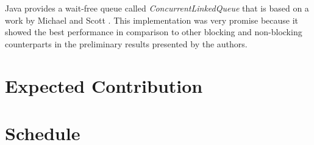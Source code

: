 \documentclass[12pt,twoside,a4paper]{article}
\begin{document}
Java provides a wait-free queue called \textit{ConcurrentLinkedQueue} that is based on a work by Michael and Scott \cite{michael1996simple}. This implementation was very promise because it showed the best performance in comparison to other blocking and non-blocking counterparts in the preliminary results presented by the authors. 


\section{Expected Contribution}
\label{sec:contrib}


 
\section{Schedule}
\label{sec:schedule}


\vskip 15mm

{}

\end{document}
